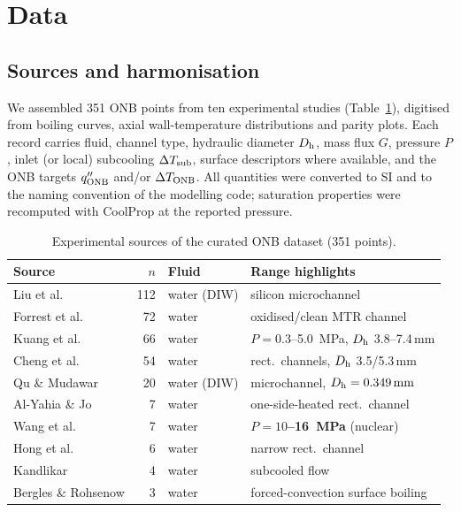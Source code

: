 \section{Data}
\label{sec:data}

\subsection{Sources and harmonisation}

We assembled 351 ONB points from ten experimental studies
(Table~\ref{tab:sources}), digitised from boiling curves, axial
wall-temperature distributions and parity plots. Each record carries fluid,
channel type, hydraulic diameter $D_{\mathrm{h}}$, mass flux $G$, pressure $P$, inlet (or
local) subcooling $\Delta T_{\mathrm{sub}}$, surface descriptors where available, and the ONB
targets $q''_{\mathrm{ONB}}$ and/or $\Delta T_{\mathrm{ONB}}$. All quantities were converted to SI and to the
naming convention of the modelling code; saturation properties were recomputed
with CoolProp at the reported pressure.

\begin{table}[t]
\centering
\caption{Experimental sources of the curated ONB dataset (351 points).}
\label{tab:sources}
\small
\begin{tabular}{lrll}
\toprule
Source & $n$ & Fluid & Range highlights \\
\midrule
Liu et al.\ \cite{LIU2005}        & 112 & water (DIW) & silicon microchannel \\
Forrest et al.\ \cite{FORREST2016}&  72 & water       & oxidised/clean MTR channel \\
Kuang et al.\ \cite{ONB2024NARROW}    &  66 & water       & $P=0.3$--\SI{5.0}{MPa}, $D_{\mathrm{h}}$ 3.8--7.4\,mm \\
Cheng et al.\ \cite{CHENG2022}    &  54 & water       & rect.\ channels, $D_{\mathrm{h}}$ 3.5/5.3\,mm \\
Qu \& Mudawar \cite{QUMUDAWAR2002}       &  20 & water (DIW) & microchannel, $D_{\mathrm{h}}=\SI{0.349}{mm}$ \\
Al-Yahia \& Jo \cite{ALYAHIA2017} &   7 & water       & one-side-heated rect.\ channel \\
Wang et al.\ \cite{WANG2024}      &   7 & water       & \textbf{$P=10$--\SI{16}{MPa}} (nuclear) \\
Hong et al.\ \cite{HONG2012}      &   6 & water       & narrow rect.\ channel \\
Kandlikar \cite{KANDLIKAR1991}    &   4 & water       & subcooled flow \\
Bergles \& Rohsenow \cite{BERGLES1964} & 3 & water    & forced-convection surface boiling \\
\bottomrule
\end{tabular}
\end{table}

